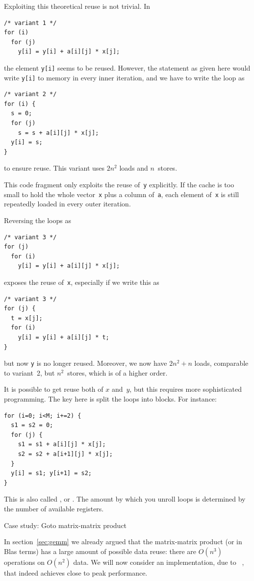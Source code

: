 Exploiting this theoretical reuse is not trivial. In
\begin{verbatim}
/* variant 1 */
for (i)
  for (j)
    y[i] = y[i] + a[i][j] * x[j];
\end{verbatim}
the element \texttt{y[i]} seems to be reused. However, the statement
as given here would write \texttt{y[i]} to memory in every inner
iteration, and we have to write the loop as
\begin{verbatim}
/* variant 2 */
for (i) {
  s = 0;
  for (j)
    s = s + a[i][j] * x[j];
  y[i] = s;
}
\end{verbatim}
to ensure reuse. This variant uses $2n^2$ loads and $n$~stores.

This code fragment only exploits the reuse
of~\texttt{y} explicitly. If the cache is too small to hold the whole
vector~\texttt{x} plus a column of~\texttt{a}, each element
of~\texttt{x} is still repeatedly loaded in every outer iteration.

Reversing the loops as
\begin{verbatim}
/* variant 3 */
for (j)
  for (i)
    y[i] = y[i] + a[i][j] * x[j];
\end{verbatim}
exposes the reuse of~\texttt{x}, especially if we write this as
\begin{verbatim}
/* variant 3 */
for (j) {
  t = x[j];
  for (i)
    y[i] = y[i] + a[i][j] * t;
}
\end{verbatim}
but now \texttt{y} is no longer
reused. Moreover, we now have $2n^2+n$ loads, comparable to variant~2,
but $n^2$~stores, which is of a higher order.

It is possible to get reuse both of $x$ and~$y$, but this requires
more sophisticated programming. The key here is split the loops into
blocks. For instance:
\begin{verbatim}
for (i=0; i<M; i+=2) {
  s1 = s2 = 0;
  for (j) {
    s1 = s1 + a[i][j] * x[j];
    s2 = s2 + a[i+1][j] * x[j];
  }
  y[i] = s1; y[i+1] = s2;
}
\end{verbatim}
This is also called ,
or . The amount by which you unroll
loops is determined by the number of available registers.

 {Case study: Goto matrix-matrix product}

In section~\ref{sec:gemm} we already argued that the matrix-matrix
product (or  in Blas terms) has a large amount of
possible data reuse: there are $O(n^3)$ operations on $O(n^2)$ data.
We will now consider an implementation, due
to ~\cite{GotoGeijn:2008:Anatomy}, that
indeed achieves close to peak performance.


